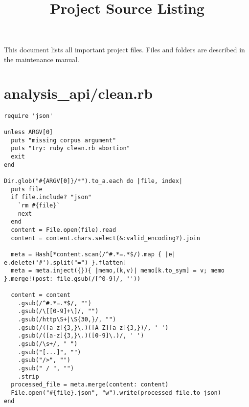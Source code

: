 \documentclass{article}
\title{Project Source Listing}
\date{}
\begin{document}
  \maketitle
  This document lists all important project files. Files and folders are described in the maintenance manual.
  \pagebreak


\section*{analysis\_api/clean.rb}
\begin{verbatim}
require 'json'

unless ARGV[0]
  puts "missing corpus argument"
  puts "try: ruby clean.rb abortion"
  exit
end

Dir.glob("#{ARGV[0]}/*").to_a.each do |file, index|
  puts file
  if file.include? "json"
    `rm #{file}`
    next
  end
  content = File.open(file).read
  content = content.chars.select(&:valid_encoding?).join

  meta = Hash[*content.scan(/^#.*=.*$/).map { |e| e.delete('#').split("=") }.flatten]
  meta = meta.inject({}){ |memo,(k,v)| memo[k.to_sym] = v; memo }.merge!(post: file.gsub(/[^0-9]/, ''))

  content = content
    .gsub(/^#.*=.*$/, "")
    .gsub(/\[[0-9]+\]/, "")
    .gsub(/http\S+|\S{30,}/, "")
    .gsub(/([a-z]{3,}\.)([A-Z][a-z]{3,})/, ' ')
    .gsub(/([a-z]{3,}\.)([0-9]\.)/, ' ')
    .gsub(/\s+/, " ")
    .gsub("[...]", "")
    .gsub("/>", "")
    .gsub(" / ", "")
    .strip
  processed_file = meta.merge(content: content)
  File.open("#{file}.json", "w").write(processed_file.to_json)
end


\end{verbatim}
\pagebreak
\end{document}
